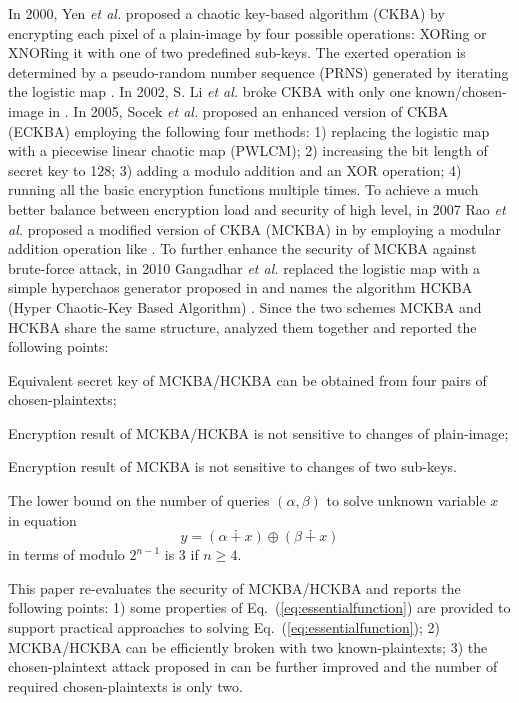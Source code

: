\documentclass{ws-ijbc}
\begin{document}
In 2000, Yen \textit{et al.} proposed a chaotic key-based algorithm (CKBA) by encrypting each pixel of a plain-image by four possible operations: XORing or XNORing
it with one of two predefined sub-keys. The exerted operation is determined by a pseudo-random number sequence (PRNS) generated by iterating the logistic map
\cite{Yen:CKBA:ISCAS2000}. In 2002, S. Li \textit{et al.} broke CKBA with only one known/chosen-image in \cite{Li-Zheng:CKBA:ISCAS2002}. In 2005, Socek \textit{et al.} proposed an enhanced
version of CKBA (ECKBA) employing the following four methods: 1) replacing the logistic map with a piecewise linear chaotic map (PWLCM); 2) increasing the bit length of secret key
to 128; 3) adding a modulo addition and an XOR operation; 4) running all the basic encryption functions multiple times. To achieve a much better balance between encryption load and
security of high level, in 2007 Rao \textit{et al.} proposed a modified version of CKBA (MCKBA) in \cite{Rao:ModifiedCKBA:ICDSP07} by employing a modular addition operation like \cite{SocekLi:SecureComm2005}. To further enhance the security of MCKBA against brute-force attack, in 2010 Gangadhar \textit{et al.} replaced
the logistic map with a simple hyperchaos generator proposed in \cite{Takahashi:HyperChaos:TCASII04} and
names the algorithm HCKBA (Hyper Chaotic-Key Based Algorithm) \cite{CH:HCKBA:IJBC10}. Since the two schemes MCKBA and HCKBA share the same
structure, \cite{LCQ:MCKBA:IJBC11} analyzed them together and reported the following points:
\begin{itemlist}
\item Equivalent secret key of MCKBA/HCKBA can be obtained from four pairs of chosen-plaintexts;

\item Encryption result of MCKBA/HCKBA is not sensitive to changes of plain-image;

\item Encryption result of MCKBA is not sensitive to changes of two sub-keys.

\item The lower bound on the number of queries $(\alpha, \beta)$ to solve unknown variable $x$ in equation
\begin{equation}
y=(\alpha\dotplus x)\oplus (\beta \dotplus x)
\label{eq:essentialfunction}
\end{equation}
in terms of modulo $2^{n-1}$ is 3 if $n\ge 4$.
\end{itemlist}

This paper re-evaluates the security of MCKBA/HCKBA and reports the following points: 1) some properties of Eq.~(\ref{eq:essentialfunction})
are provided to support practical approaches to solving Eq.~(\ref{eq:essentialfunction}); 2) MCKBA/HCKBA can be efficiently broken with two
known-plaintexts; 3) the chosen-plaintext attack proposed in \cite{LCQ:MCKBA:IJBC11} can be further improved and the number of required
chosen-plaintexts is only two.
\end{document}
